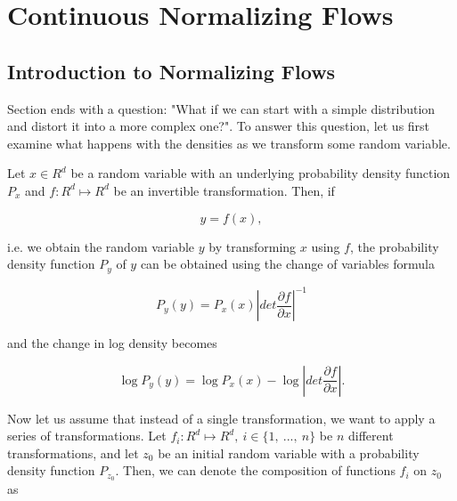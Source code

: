 \chapter{Continuous Normalizing Flows}
\label{chapter:cnf}

\section{Introduction to Normalizing Flows}
\label{section:cnf:normalizing_flows}

Section ends with a question: "What if we can start with a simple distribution and distort it into a more complex one?". To answer this question, let us first examine what happens with  the densities as we transform some random variable.

Let $ x \in R^d $ be a random variable with an underlying probability density function $ P_x $ and $ f: R^d \mapsto R^d $ be an invertible transformation. Then, if

\begin{displaymath}
    y = f(x),
\end{displaymath}


i.e. we obtain the random variable $ y $ by transforming $ x $ using $ f $, the probability density function $ P_y $ of $ y $ can be obtained using the change of variables formula


\begin{equation}
    \label{equation:cnf:nf:change_density}
    P_y(y) = P_x(x) \left | det \frac{\partial f}{\partial x} \right |^{-1}
\end{equation}

and the change in log density becomes

\begin{equation}
    \label{equation:cnf:nf:change_log_density}
    \log P_y(y) = \log P_x(x) - \log \left | det \frac{\partial f}{\partial x} \right |.
\end{equation}

Now let us assume that instead of a single transformation, we want to apply a series of transformations. Let $ f_i: R^d \mapsto R^d, \ i \in \{1, \ ..., \ n\} $ be $ n $ different transformations, and let $ z_0 $ be an initial random variable with a probability density function $ P_{z_0} $. Then, we can denote the composition of functions $ f_i $ on $ z_0 $ as

